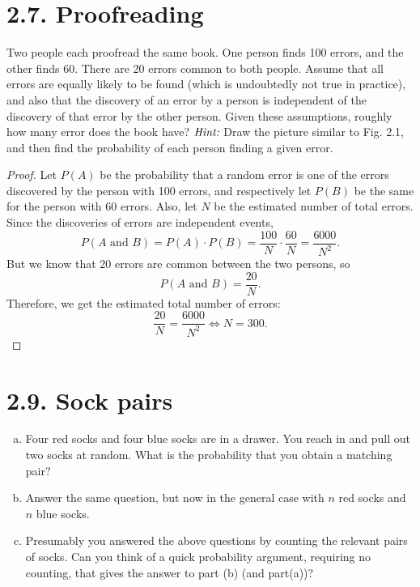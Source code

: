 \section*{2.7. Proofreading}
Two people each proofread the same book. One person finds 100 errors, and the other finds 60. 
There are 20 errors common to both people. Assume that all errors are equally likely to be found (which is 
undoubtedly not true in practice), and also that the discovery of an error by a person is independent
of the discovery of that error by the other person. Given these assumptions, roughly how many error 
does the book have? $\emph{Hint:}$ Draw the picture similar to Fig. 2.1, and then find the probability 
of each person finding a given error.

\vspace{1em}

\begin{proof}
    \hfill

    Let $P(A)$ be the probability that a random error is one of the errors discovered 
    by the person with 100 errors, and respectively let $P(B)$ be the same for the person with 60 errors.
    Also, let $N$ be the estimated number of total errors.
    Since the discoveries of errors are independent events, 
    \[
        P(A \text{ and } B) = P(A) \cdot P(B) = \frac{100}{N} \cdot \frac{60}{N} = \frac{6000}{N^2}
    .\] 
    But we know that 20 errors are common between the two persons, so
    \[
        P(A \text{ and } B) = \frac{20}{N}
    .\] 
    Therefore, we get the estimated total number of errors:
    \[
        \frac{20}{N} = \frac{6000}{N^2} \iff N = 300
    .\] 
\end{proof}

\section*{2.9. Sock pairs}
\begin{enumerate}[(a)]
    \item Four red socks and four blue socks are in a drawer. You reach in and pull out two socks at random.
        What is the probability that you obtain a matching pair?

    \item Answer the same question, but now in the general case with $n$ red socks and $n$ blue socks.

    \item Presumably you answered the above questions by counting the relevant pairs of socks.
        Can you think of a quick probability argument, requiring no counting, that gives the
        answer to part (b) (and part(a))?
\end{enumerate}

